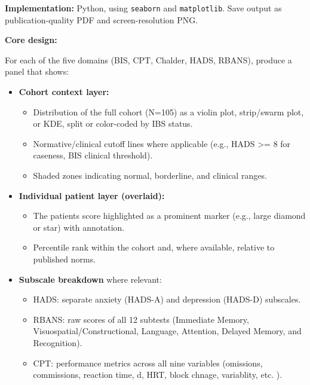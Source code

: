 \textbf{Implementation:} Python, using \passthrough{\lstinline!seaborn!}
and \passthrough{\lstinline!matplotlib!}. Save output as
publication-quality PDF and screen-resolution PNG.

\textbf{Core design:}

For each of the five domains (BIS, CPT, Chalder, HADS, RBANS), produce a
panel that shows:

\begin{itemize}
\item
  \textbf{Cohort context layer:}

  \begin{itemize}
  \tightlist
  \item
    Distribution of the full cohort (N=105) as a violin plot,
    strip/swarm plot, or KDE, split or color-coded by IBS status.
  \item
    Normative/clinical cutoff lines where applicable (e.g., HADS
    \textgreater= 8 for caseness, BIS clinical threshold).
  \item
    Shaded zones indicating normal, borderline, and clinical ranges.
  \end{itemize}
\item
  \textbf{Individual patient layer (overlaid):}

  \begin{itemize}
  \tightlist
  \item
    The patient\textquotesingle s score highlighted as a prominent
    marker (e.g., large diamond or star) with annotation.
  \item
    Percentile rank within the cohort and, where available, relative to
    published norms.
  \end{itemize}
\item
  \textbf{Subscale breakdown} where relevant:

  \begin{itemize}
  \tightlist
  \item
    HADS: separate anxiety (HADS-A) and depression (HADS-D) subscales.
  \item
    RBANS: raw scores of all 12 subtests (Immediate Memory,
    Visuospatial/Constructional, Language, Attention, Delayed Memory,
    and Recognition).
  \item
    CPT: performance metrics across all nine variables (omissions,
    commissions, reaction time, d\textquotesingle, HRT, block chnage,
    variablity, etc. ).
  \end{itemize}
\end{itemize}

